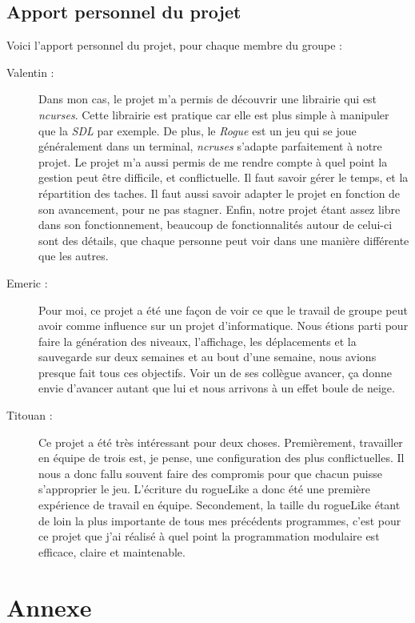\documentclass[11pt]{report}
\begin{document}
	\section{Apport personnel du projet}
	
	Voici l'apport personnel du projet, pour chaque membre du groupe :
	
	\begin{description}
	\item[Valentin :] Dans mon cas, le projet m'a permis de découvrir une librairie qui est \emph{ncurses}. Cette librairie est pratique car elle est plus simple à manipuler que la \emph{SDL} par exemple. De plus, le \emph{Rogue} est un jeu qui se joue généralement dans un terminal, \emph{ncruses} s'adapte parfaitement à notre projet. Le projet m'a aussi permis de me rendre compte à quel point la gestion peut être difficile, et conflictuelle. Il faut savoir gérer le temps, et la répartition des taches. Il faut aussi savoir adapter le projet en fonction de son avancement, pour ne pas stagner. Enfin, notre projet étant assez libre dans son fonctionnement, beaucoup de fonctionnalités autour de celui-ci sont des détails, que chaque personne peut voir dans une manière différente que les autres. 
	\item[Emeric :] Pour moi, ce projet a été une façon de voir ce que le travail de groupe peut avoir comme influence sur un projet d'informatique. Nous étions parti pour faire la génération des niveaux, l'affichage, les déplacements et la sauvegarde sur deux semaines et au bout d'une semaine, nous avions presque fait tous ces objectifs. Voir un de ses collègue avancer, ça donne envie d'avancer autant que lui et nous arrivons à un effet boule de neige.
	\item[Titouan :] Ce projet a été très intéressant pour deux choses. Premièrement, travailler en équipe de trois est, je pense, une configuration des plus conflictuelles. Il nous a donc fallu souvent faire des compromis pour que chacun puisse s'approprier le jeu. L'écriture du rogueLike a donc été une première expérience de travail en équipe. Secondement, la taille du rogueLike étant de loin la plus importante de tous mes précédents programmes, c'est pour ce projet que j'ai réalisé à quel point la programmation modulaire est efficace, claire et maintenable.
	\end{description}

\chapter*{Annexe}
\end{document}
